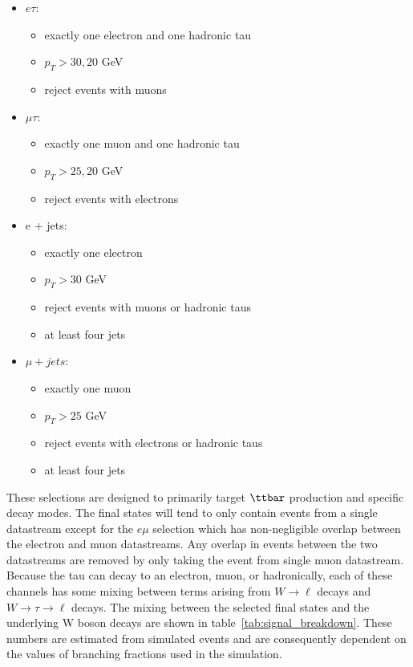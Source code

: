 \begin{itemize}
\begin{itemize}
    \end{itemize}
    \item $e\tau$:
    \begin{itemize}
        \item exactly one electron and one hadronic tau
        \item $p_{T} > 30, 20$ GeV
        \item reject events with muons
    \end{itemize}
    \item $\mu\tau$:
    \begin{itemize}
        \item exactly one muon and one hadronic tau
        \item $p_{T} > 25, 20$ GeV
        \item reject events with electrons
    \end{itemize}
    \item e + jets:
    \begin{itemize}
        \item exactly one electron 
        \item $p_{T} > 30$ GeV
        \item reject events with muons or hadronic taus
        \item at least four jets
    \end{itemize}
    \item $\mu + jets$:
    \begin{itemize}
        \item exactly one muon 
        \item $p_{T} > 25$ GeV
        \item reject events with electrons or hadronic taus
        \item at least four jets
    \end{itemize}
\end{itemize}

These selections are designed to primarily target $\ttbar$ production
and specific \PW decay modes.  The final states will tend to only
contain events from a single datastream except for the $e\mu$ selection
which has non-negligible overlap between the electron and muon
datastreams.  Any overlap in events between the two datastreams are
removed by only taking the event from single muon datastream.  Because
the tau can decay to an electron, muon, or hadronically, each of these
channels has some mixing between terms arising from $W\rightarrow\ell$
decays and $W\rightarrow\tau\rightarrow\ell$ decays.  The mixing between
the selected final states and the underlying W boson decays are shown in
table~\ref{tab:signal_breakdown}.  These numbers are estimated from
simulated \ttbar events and are consequently dependent on the values of
branching fractions used in the simulation.  

